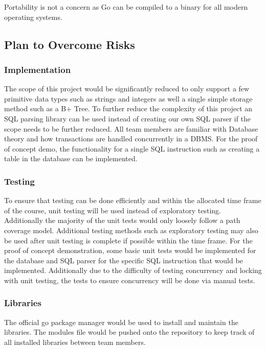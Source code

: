 \documentclass[12pt,letterpaper]{article}
\begin{document}
Portability is not a concern as Go can be compiled to a binary for all modern operating systems.

\subsection{Plan to Overcome Risks}

\subsubsection{Implementation}

The scope of this project would be significantly reduced to only support a few primitive data types such as strings and integers as well a single simple storage method such as a B+ Tree. To further reduce the complexity of this project an SQL parsing library can be used instead of creating our own SQL parser if the scope needs to be further reduced. All team members are familiar with Database theory and how transactions are handled concurrently in a DBMS. For the proof of concept demo, the functionality for a single SQL instruction such as creating a table in the database can be implemented.

\subsubsection{Testing}

To ensure that testing can be done efficiently and within the allocated time frame of the course, unit testing will be used instead of exploratory testing. Additionally the majority of the unit tests would only loosely follow a path coverage model. Additional testing methods such as exploratory testing may also be used after unit testing is complete if possible within the time frame. For the proof of concept demonstration, some basic unit tests would be implemented for the database and SQL parser for the specific SQL instruction that would be implemented. {\color{red} Additionally due to the difficulty of testing concurrency and locking with unit testing, the tests to ensure concurrency will be done via manual tests}.

\subsubsection{Libraries}

The official go package manager would be used to install and maintain the libraries. The modules file would be pushed onto the repository to keep track of all installed libraries between team members.
\end{document}
